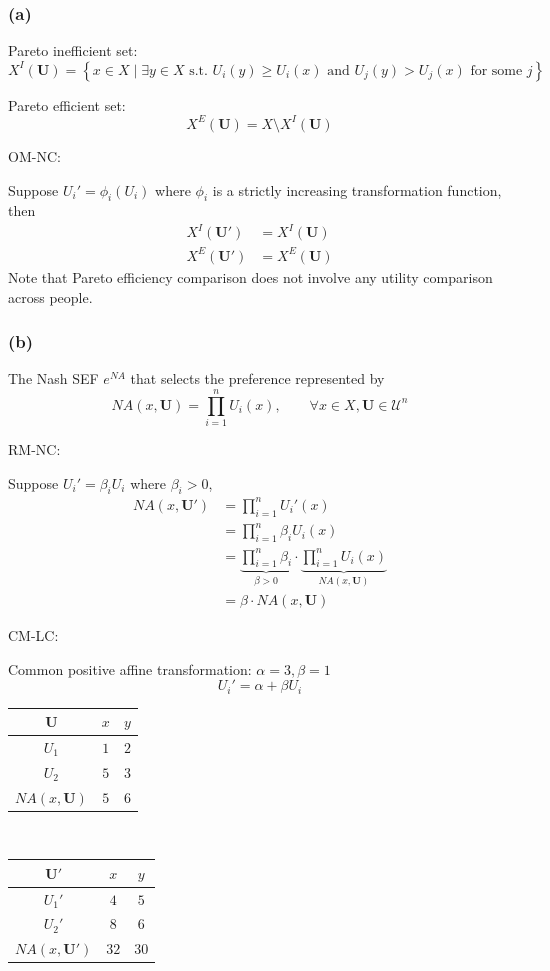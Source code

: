 \documentclass[a4paper]{article}
\begin{document}
\subsubsection*{(a)}

Pareto inefficient set:
\[X^{I}(\mathbf{U})=\left\{x\in X \mid \exists y\in X \text{ s.t. } U_i(y)\geq U_i(x) \text{ and } U_j(y)>U_j(x) \text{ for some } j \right\} \]

Pareto efficient set:
\[X^{E}(\mathbf{U})=X\setminus X^{I}(\mathbf{U}) \]

OM-NC:

Suppose $U_i'=\phi_i(U_i)$ where $\phi_i$ is a strictly increasing transformation function, then
\begin{align*}
    X^I(\mathbf{U}') &= X^I(\mathbf{U}) \\
    X^E(\mathbf{U}') &= X^E(\mathbf{U})
\end{align*}
Note that Pareto efficiency comparison does not involve any utility comparison across people.

\subsubsection*{(b)}

The Nash SEF $e^{NA}$ that selects the preference represented by
\[NA(x,\mathbf{U})=\prod_{i=1}^{n} U_i(x), \qquad \forall x\in X, \mathbf{U}\in\mathscr{U}^{n} \]

RM-NC:

Suppose $U_i'=\beta_iU_i$ where $\beta_i>0$,
\begin{align*}
    NA(x,\mathbf{U}') &= \prod_{i=1}^{n}U_i'(x) \\
    &= \prod_{i=1}^{n}\beta_i U_i(x) \\
    &= \underbrace{\prod_{i=1}^{n}\beta_i}_{\beta>0} \cdot \underbrace{\prod_{i=1}^{n}U_i(x)}_{NA(x,\mathbf{U})} \\
    &= \beta \cdot NA(x,\mathbf{U})
\end{align*}

CM-LC:

Common positive affine transformation: $\alpha=3, \beta=1$
\[U_i'=\alpha + \beta U_i \]
\begin{table}[!htbp]
    \centering
    \begin{tabular}{c|cc|}
        $\mathbf{U}$ & $x$ & $y$              \\ 
        \hline
        $U_1$        & $1$ & $2$ \\
        $U_2$        & $5$ & $3$ \\
        \hline
        $NA(x,\mathbf{U})$ & $5$ & $6$ \\
    \end{tabular}
    $\qquad\qquad$
    \begin{tabular}{c|cc|}
        $\mathbf{U'}$ & $x$ & $y$              \\ 
        \hline
        $U_1'$        & $4$ & $5$ \\
        $U_2'$        & $8$ & $6$ \\
        \hline
        $NA(x,\mathbf{U}')$ & $32$ & $30$ \\
    \end{tabular}
\end{table}
\end{document}
